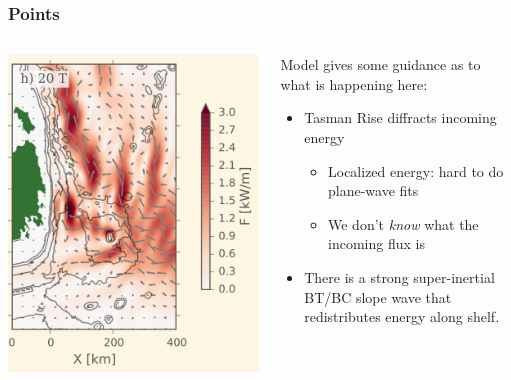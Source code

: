 \documentclass[]{beamer}
\begin{document}
\begin{frame}
  \frametitle{Points}
  \begin{columns}
    \begin{column}{0.4\textwidth}
      \includegraphics[width=\textwidth]{doc/Tide20Full.png}
      
    \end{column}
    \begin{column}{0.5\textwidth}
      Model gives some guidance as to what is happening here:
      \begin{itemize}
        \item<1-> Tasman Rise diffracts incoming energy
          \begin{itemize}
             \item<1-> Localized energy: hard to do plane-wave fits
             \item<1-> We don't \emph{know} what the incoming flux is
          \end{itemize}
        \item<2-> There is a strong super-inertial BT/BC slope wave that redistributes energy along shelf.
      \end{itemize}
    \end{column}
  \end{columns}
\end{frame}
\end{document}
